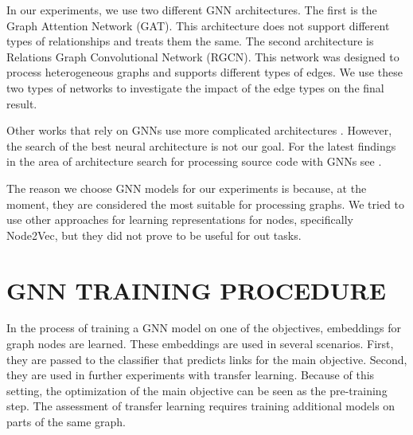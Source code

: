 \documentclass[a4paper,twoside]{article}
\begin{document}
In our experiments, we use two different GNN architectures. The first is the Graph Attention Network (GAT). This architecture does not support different types of relationships and treats them the same. The second architecture is Relations Graph Convolutional Network (RGCN). This network was designed to process heterogeneous graphs and supports different types of edges. We use these two types of networks to investigate the impact of the edge types on the final result. 

Other works that rely on GNNs use more complicated architectures \cite{Allamanis2017} \cite{Cvitkovic2018}. However, the search of the best neural architecture is not our goal. For the latest findings in the area of architecture search for processing source code with GNNs see \cite{hellendoorn2020global}.

The reason we choose GNN models for our experiments is because, at the moment, they are considered the most suitable for processing graphs. 
We tried to use other approaches for learning representations for nodes, specifically Node2Vec, but they did not prove to be useful for out tasks.





\section{\uppercase{GNN Training Procedure}}

In the process of training a GNN model on one of the objectives, embeddings for graph nodes are learned. These embeddings are used in several scenarios. First, they are passed to the classifier that predicts links for the main objective. Second, they are used in further experiments with transfer learning. Because of this setting, the optimization of the main objective can be seen as the pre-training step. The assessment of transfer learning requires training additional models on parts of the same graph.
\end{document}
